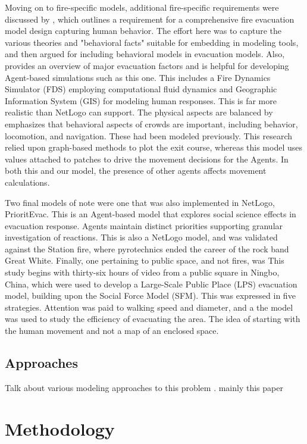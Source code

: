 \documentclass[12pt,letterpaper]{article}
\begin{document}
Moving on to fire-specific models, additional fire-specific requirements were discussed by \cite{kuligowskil}, which outlines a requirement for a comprehensive fire evacuation model design capturing human behavior. The effort here was to capture the various theories and "behavioral facts" suitable for embedding in modeling tools, and then argued for including behavioral models in evacuation models. Also, \cite{abmEvac} provides an overview of major evacuation factors and is helpful for developing Agent-based simulations such as this one. This includes a Fire Dynamics Simulator (FDS) employing computational fluid dynamics and Geographic Information System (GIS) for modeling human responses. This is far more realistic than NetLogo can support. The physical aspects are balanced by \cite{kneidl} emphasizes that behavioral aspects of crowds are  important, including behavior, locomotion, and navigation. These had been modeled previously. This research relied upon graph-based methods to plot the exit course, whereas this model uses values attached to patches to drive the movement decisions for the Agents. In both this and our model, the presence of other agents affects movement calculations.

Two final models of note were one that was also implemented in NetLogo, \cite{prioritEvac} PrioritEvac. This is an Agent-based model that explores social science effects in evacuation response. Agents maintain distinct priorities supporting granular investigation of reactions. This is also a NetLogo model, and was validated against the Station fire, where pyrotechnics ended the career of the rock band Great White.
Finally, one pertaining to public space, and not fires, was \cite{zhouSimulationPedestrianEvacuation2019} This study begins with thirty-six hours of video from a public square in Ningbo, China, which were used to develop a Large-Scale Public Place (LPS) evacuation model, building upon the Social Force Model (SFM). This was expressed in five strategies. Attention was paid to walking speed and diameter, and a the model was used to study the efficiency of evacuating the area. The idea of starting with the human movement and not a map of an enclosed space.

\subsection {Approaches}
Talk about various modeling approaches to this problem   . mainly this paper \cite{almeidaCrowdSimulationModeling2013} 
\section {Methodology}
\end{document}
